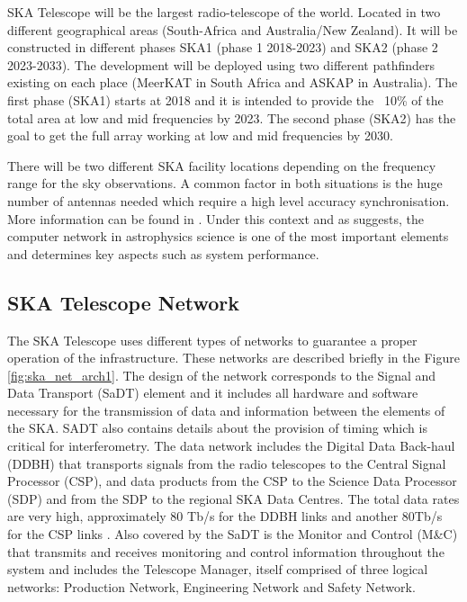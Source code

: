 SKA Telescope will be the largest radio-telescope of the world. Located in two 
different
geographical areas (South-Africa and Australia/New Zealand). It will be
constructed in different phases SKA1 (phase 1 2018-2023) and SKA2 (phase 2
2023-2033). The development will be deployed using two different pathfinders
existing on each place (MeerKAT in South Africa and ASKAP in Australia).  The
first phase (SKA1) starts at 2018 and it is intended to provide the ~10\% of
the total area at low and mid frequencies by 2023. The second phase (SKA2) has
the goal to get the full array working at low and mid frequencies by 2030.

There will be two different SKA facility locations depending on the frequency
range for the sky observations. A common factor in both situations is the huge
number of antennas needed which require a high level accuracy synchronisation.
More information can be found in  \cite{ska:baseline_description_v2}. Under
this context and as \cite{HUANG201727} suggests, the computer network in
astrophysics science is one of the most important elements and determines key
aspects such as system performance.

\subsection{SKA Telescope Network} \label{subsec:ska-telescope}

The SKA Telescope uses different types of networks to guarantee a proper
operation of the infrastructure. These networks are described briefly in the
Figure \ref{fig:ska_net_arch1}. The design of the network corresponds to the
Signal and Data Transport (SaDT) element \cite{ska:sadt_website} and it
includes all hardware and software necessary for the transmission of data and
information between the elements of the SKA. SADT also contains details about
the provision of timing which is critical for interferometry.  The data network
includes the Digital Data Back-haul (DDBH) that transports signals from the
radio telescopes to the Central Signal Processor (CSP), and data products from
the CSP to the Science Data Processor (SDP) and from the SDP to the regional
SKA Data Centres. The total data rates are very high, approximately 80 Tb/s for
the DDBH links and another 80Tb/s for the CSP links \cite{ska:consortia-news}.
Also covered by the SaDT is the Monitor and Control (M\&C) that transmits and
receives monitoring and control information throughout the system and includes
the Telescope Manager, itself comprised of three logical networks: Production
Network, Engineering Network and Safety Network.

